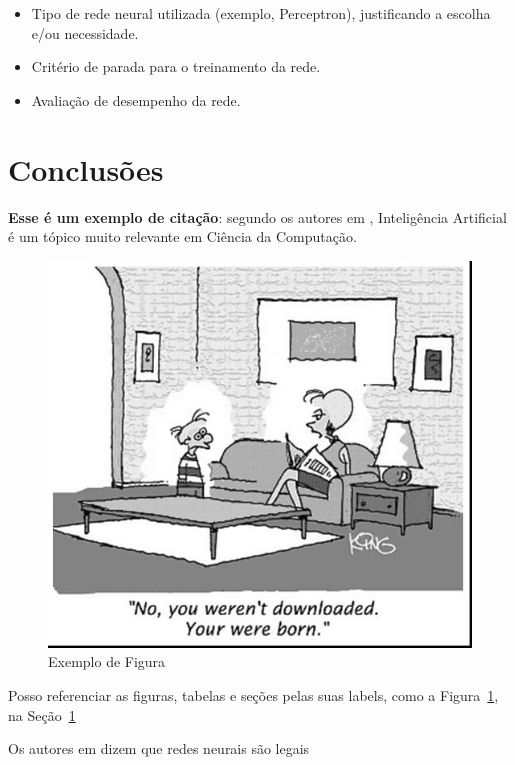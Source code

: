 \documentclass[12pt]{article}
\begin{document}
\begin{itemize}
    \item Tipo de rede neural utilizada (exemplo, Perceptron), justificando a escolha e/ou necessidade.
    \item Critério de parada para o treinamento da rede.
    \item Avaliação de desempenho da rede.
\end{itemize}

\section{Conclusões}\label{sec:conclusao}

\textbf{Esse é um exemplo de citação}: segundo os autores em \cite{Russell2002LivroIA}, Inteligência Artificial é um tópico muito relevante em Ciência da Computação.

\begin{figure}[ht]
\centering
\includegraphics[width=.4\textwidth]{fig1.jpg}
\caption{Exemplo de Figura}
\label{fig:exampleFig1}
\end{figure}

Posso referenciar as figuras, tabelas e seções pelas suas labels, como a Figura~\ref{fig:exampleFig1}, na Seção~\ref{sec:conclusao}

Os autores em \cite{haykin2007redes} dizem que redes neurais são legais



\end{document}
